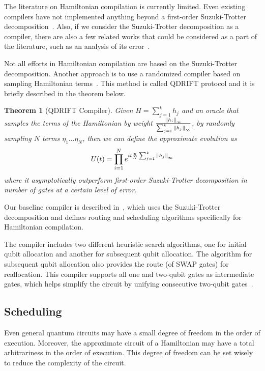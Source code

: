 \documentclass{report}
\newtheorem{theorem}{Theorem}
\begin{document}
The literature on Hamiltonian compilation is currently limited. Even existing compilers have not implemented anything beyond a first-order Suzuki-Trotter decomposition~\cite{sivarajah2021, qiskit2023}. Also, if we consider the Suzuki-Trotter decomposition as a compiler, there are also a few related works that could be considered as a part of the literature, such as an analysis of its error~\cite{childs2021}.

Not all efforts in Hamiltonian compilation are based on the Suzuki-Trotter decomposition. Another approach is to use a randomized compiler based on sampling Hamiltonian terms~\cite{campbell2019}. This method is called QDRIFT protocol and it is briefly described in the theorem below.

\begin{theorem}[QDRIFT Compiler]
  Given $H = \sum_{j=1}^k h_j$ and an oracle that samples the terms of the Hamiltonian by weight $\frac{\norm{h_i}_\infty}{\sum_{j=1}^k \norm{h_j}_\infty}$, by randomly sampling $N$ terms $\eta_1 \dots \eta_N$, then we can define the approximate evolution as
  \begin{equation}
    U(t) = \prod_{i=1}^N e^{it\frac{\eta}{N}\sum_{j=1}^k \norm{h_j}_\infty}
  \end{equation}
  where it asymptotically outperform first-order Suzuki-Trotter decomposition in number of gates at a certain level of error.
\end{theorem}

Our baseline compiler is described in~\cite{lao2021}, which uses the Suzuki-Trotter decomposition and defines routing and scheduling algorithms specifically for Hamiltonian compilation.

The compiler includes two different heuristic search algorithms, one for initial qubit allocation and another for subsequent qubit allocation. The algorithm for subsequent qubit allocation also provides the route (of SWAP gates) for reallocation. This compiler supports all one and two-qubit gates as intermediate gates, which helps simplify the circuit by unifying consecutive two-qubit gates~\cite{lao2021}.


\subsection{Scheduling}

Even general quantum circuits may have a small degree of freedom in the order of execution. Moreover, the approximate circuit of a Hamiltonian may have a total arbitrariness in the order of execution. This degree of freedom can be set wisely to reduce the complexity of the circuit.
\end{document}

